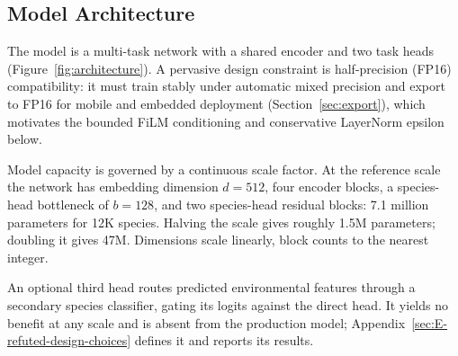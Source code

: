 \subsection{Model Architecture}
\label{sec:architecture}

The model is a multi-task network with a shared encoder and two task heads (Figure~\ref{fig:architecture}). A pervasive design constraint is half-precision (FP16) compatibility: it must train stably under automatic mixed precision and export to FP16 for mobile and embedded deployment (Section~\ref{sec:export}), which motivates the bounded FiLM conditioning and conservative LayerNorm epsilon below.

Model capacity is governed by a continuous scale factor. At the reference scale the network has embedding dimension $d = 512$, four encoder blocks, a species-head bottleneck of $b = 128$, and two species-head residual blocks: 7.1 million parameters for 12K species. Halving the scale gives roughly 1.5M parameters; doubling it gives 47M. Dimensions scale linearly, block counts to the nearest integer.

An optional third head routes predicted environmental features through a secondary species classifier, gating its logits against the direct head. It yields no benefit at any scale and is absent from the production model; Appendix~\ref{sec:E-refuted-design-choices} defines it and reports its results.


